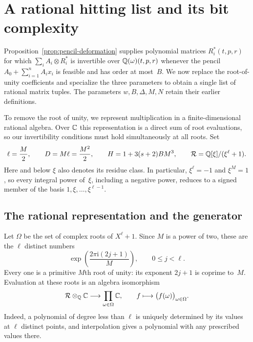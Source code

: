 \section{A rational hitting list and its bit complexity}
\label{sec:generator}

Proposition~\ref{prop:pencil-deformation} supplies polynomial matrices
$R_i^*(t,p,r)$ for which $\sum_i A_i\otimes R_i^*$ is invertible
over $\mathbb Q(\omega)(t,p,r)$ whenever the pencil
$A_0+\sum_{i=1}^n A_i x_i$ is feasible and has order at most~$B$.
We now replace the root-of-unity coefficients and specialize the
three parameters to obtain a single list of rational matrix tuples.
The parameters $w,B,\Delta,M,N$ retain their earlier definitions.

To remove the root of unity, we represent multiplication in a
finite-dimensional rational algebra. Over $\mathbb C$ this representation
is a direct sum of root evaluations, so our invertibility conditions
must hold simultaneously at all roots. Set
\begin{equation}
  \ell=\frac M2,\qquad D=M\ell=\frac{M^2}{2},\qquad
  H=1+3(s+2)BM^3,
  \qquad
  \mathcal R=\mathbb Q[\xi]/(\xi^\ell+1).
  \label{eq:generator-parameters}
\end{equation}
Here and below $\xi$ also denotes its residue class. In particular,
$\xi^\ell=-1$ and $\xi^M=1$, so every integral power of~$\xi$, including
a negative power, reduces to a signed member of the basis
$1,\xi,\ldots,\xi^{\ell-1}$.

\subsection{The rational representation and the generator}

Let $\Omega$ be the set of complex roots of $X^\ell+1$. Since $M$ is a
power of two, these are the $\ell$ distinct numbers
\[
  \exp\!\left(\frac{2\pi\mathrm{i}(2j+1)}{M}\right),
  \qquad 0\le j<\ell.
\]
Every one is a primitive $M$th root of unity: its exponent $2j+1$ is
coprime to~$M$. Evaluation at these roots is an algebra isomorphism
\begin{equation}
  \mathcal R\otimes_{\mathbb Q}\mathbb C
    \longrightarrow \prod_{\omega\in\Omega}\mathbb C,
  \qquad f\longmapsto \bigl(f(\omega)\bigr)_{\omega\in\Omega}.
  \label{eq:cyclotomic-splitting}
\end{equation}
Indeed, a polynomial of degree less than $\ell$ is uniquely determined
by its values at $\ell$ distinct points, and interpolation gives a
polynomial with any prescribed values there.

